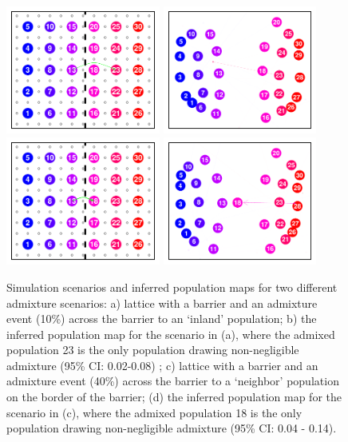 \documentclass[12pt]{article}
\begin{document}
\begin{figure}[htp!]
	\centering
			{\includegraphics[width=2in,height=1.66in]{figs/sims/barr_inland_ad_lattice.pdf}}
			{\includegraphics[width=2in,height=1.66in]{figs/sims/GeoGenMap_barr_inland_admixture_1.pdf}}
			{\includegraphics[width=2in,height=1.66in]{figs/sims/big_barr_ad_lattice.pdf}}
			{\includegraphics[width=2in,height=1.66in]{figs/sims/GeoGenMap_big_barr_ad_1.pdf}}
	\caption{
    Simulation scenarios and inferred population maps for two different admixture scenarios: a) lattice with a barrier and an admixture event (10\%) across the barrier to an `inland' population; b) the inferred population map for the scenario in (a), where the admixed population 23 is the only population drawing non-negligible admixture (95\% CI: 0.02-0.08) ; c) lattice with a barrier and an admixture event (40\%) across the barrier to a `neighbor' population on the border of the barrier; (d) the inferred population map for the scenario in (c), where the admixed population 18 is the only population drawing non-negligible admixture (95\% CI: 0.04 - 0.14).
}\label{sfig:barr_inland_ad}
\end{figure}
\end{document}
